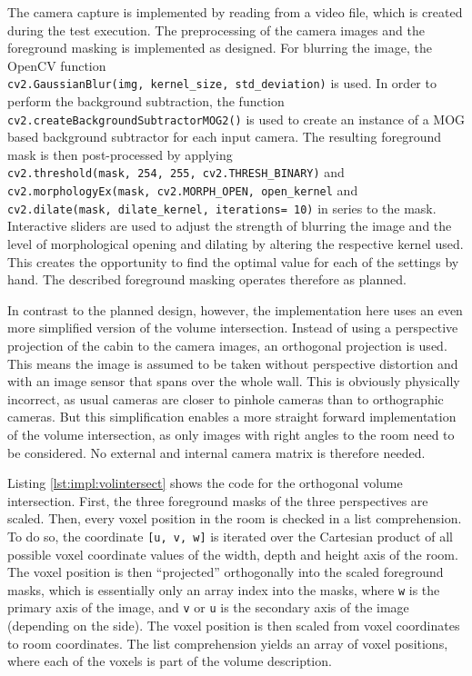 The camera capture is implemented by reading from a video file, which is created during the test execution.
The preprocessing of the camera images and the foreground masking is implemented as designed.
For blurring the image, the OpenCV function\\
\texttt{cv2.GaussianBlur(img, kernel\_size, std\_deviation)} is used.
In order to perform the background subtraction, the function\\
\texttt{cv2.createBackgroundSubtractorMOG2()} is used to create an instance of a \ac{MOG} based background subtractor for each input camera.
The resulting foreground mask is then post-processed by applying\\
\texttt{cv2.threshold(mask, 254, 255, cv2.THRESH\_BINARY)} and \\
\texttt{cv2.morphologyEx(mask, cv2.MORPH\_OPEN, open\_kernel} and \\
\texttt{cv2.dilate(mask, dilate\_kernel, iterations= 10)} in series to the mask.
Interactive sliders are used to adjust the strength of blurring the image and the level of morphological opening and dilating by altering the respective kernel used.
This creates the opportunity to find the optimal value for each of the settings by hand.
The described foreground masking operates therefore as planned.

In contrast to the planned design, however, 
the implementation here uses an even more simplified version of the volume intersection.
Instead of using a perspective projection of the cabin to the camera images,
an orthogonal projection is used.
This means the image is assumed to be taken without perspective distortion and with an image sensor that spans over the whole wall.
This is obviously physically incorrect, as usual cameras are closer to pinhole cameras than to orthographic cameras.
But this simplification enables a more straight forward implementation of the volume intersection, as only images with right angles to the room need to be considered.
No external and internal camera matrix is therefore needed.

Listing \ref{lst:impl:volintersect} shows the code for the orthogonal volume intersection.
First, the three  foreground masks of the three perspectives are scaled.
Then, every voxel position in the room is checked in a list comprehension.
To do so, the coordinate \texttt{[u, v, w]} is iterated over the Cartesian product 
of all possible voxel coordinate values of the width, depth and height axis of the room.
The voxel position is then \enquote{projected} orthogonally into the scaled foreground masks, which is essentially only an array index into the masks, where \texttt{w} is the primary axis of the image, and \texttt{v} or \texttt{u} is the secondary axis of the image (depending on the side).
The voxel position is then scaled from voxel coordinates to room coordinates.
The list comprehension yields an array of voxel positions, where each of the voxels is part of the volume description.


